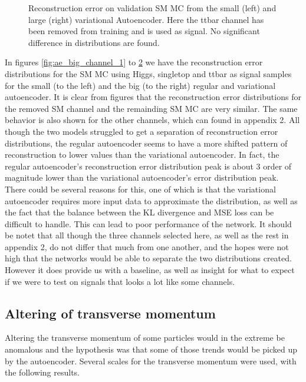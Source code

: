 \begin{figure}[H]
\begin{subfigure}{.45\textwidth}
        \caption{ }
        \label{fig:vae_big_ttbar}
    \end{subfigure}
    \hfill 
    \caption[VAE | Reconstruction error using ttbar channel as signal]{Reconstruction error on validation SM MC from the small (left) and large (right) variational Autoencoder. Here the ttbar channel has been removed from training and 
    is used as signal. No significant difference in distributions are found.  }
    \label{fig:vae_big_channel_3}
\end{figure}

In figures \ref{fig:ae_big_channel_1} to \ref{fig:vae_big_channel_3} we have the reconstruction error distributions for the SM MC using 
Higgs, singletop and ttbar as signal samples for the small (to the left) and the big (to the right) regular and variational autoencoder. 
It is clear from figures that the reconstruction error distributions for the removed SM channel and the remainding SM MC are very similar. 
The same behavior is also shown for the other channels, which can found in appendix 2. All though the two models struggled to get a 
separation of reconstruction error distributions, the regular autoencoder seems to have a more shifted pattern of reconstruction to lower 
values than the variational autoencoder. In fact, the regular autoencoder's reconstruction error distribution peak is about 3 order of 
magnitude lower than the variational autoencoder's error distribution peak. There could be several reasons for this, one of which is that 
the variational autoencoder requires more input data to approximate the distribution, as well as the fact that the balance between the KL divergence and MSE loss 
can be difficult to handle\cite{kl_mse_balance}. This can lead to poor performance of the network. It should be notet that all though the 
three channels selected here, as well as the rest in appendix 2, do not differ that much from one another, and the hopes were not high that 
the networks would be able to separate the two distributions created. However it does provide us with a baseline, as well as insight for what 
to expect if we were to test on signals that looks a lot like some channels. 


\newpage


\subsection*{Altering of transverse momentum}
Altering the transverse momentum of some particles would in the extreme be anomalous and the hypothesis was that some of those trends would be
picked up by the autoencoder. Several scales for the transverse momentum were used, with the following results.


